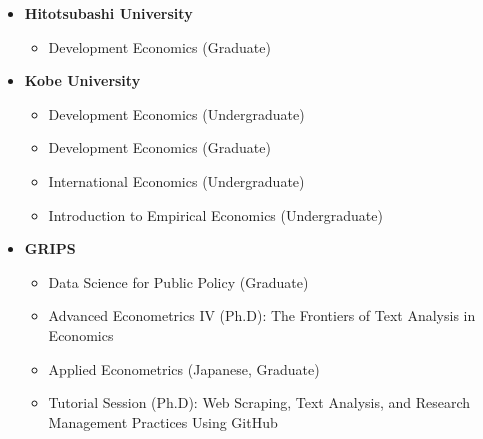 \documentclass[12pt]{article}
\begin{document}
\begin{itemize}
\item \textbf{Hitotsubashi University}
\begin{itemize}
    \item Development Economics (Graduate)
\end{itemize}

\item \textbf{Kobe University}
\begin{itemize}
    \item Development Economics (Undergraduate)
    \item Development Economics (Graduate)
    \item International Economics (Undergraduate)
    \item Introduction to Empirical Economics (Undergraduate)
\end{itemize}

\item \textbf{GRIPS}
\begin{itemize}
    \item Data Science for Public Policy (Graduate)
    \item Advanced Econometrics IV (Ph.D): The Frontiers of Text Analysis in Economics
    \item Applied Econometrics (Japanese, Graduate)
    \item Tutorial Session (Ph.D): Web Scraping, Text Analysis, and Research Management Practices Using GitHub
\end{itemize}
\end{itemize}
\end{document}
